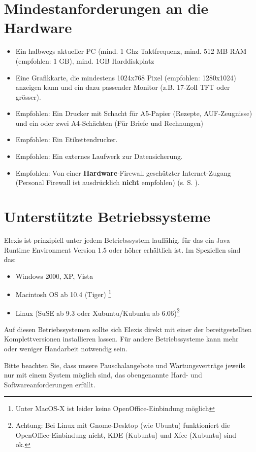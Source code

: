 %

\section{Mindestanforderungen an die Hardware}
\label{systemvoraussetzungen}
\begin{itemize}
 \item Ein halbwegs aktueller PC (mind. 1 Ghz Taktfrequenz, mind. 512 MB RAM
 (empfohlen: 1 GB), mind. 1GB Harddiskplatz
\item  Eine Grafikkarte, die mindestens 1024x768 Pixel (empfohlen: 1280x1024)
anzeigen kann und ein dazu passender Monitor (z.B. 17-Zoll TFT oder grösser).
\item Empfohlen: Ein Drucker mit Schacht für A5-Papier (Rezepte, AUF-Zeugnisse) und ein oder zwei A4-Schächten (Für Briefe und Rechnungen)
\item Empfohlen: Ein Etikettendrucker.
\item Empfohlen: Ein externes Laufwerk zur Datensicherung.
\item Empfohlen: Von einer \textbf{Hardware}-Firewall geschützter Internet-Zugang (Personal Firewall ist ausdrücklich \textbf{nicht} empfohlen) (s. S. \pageref{sicherheit}).
\end{itemize}

\section{Unterstützte Betriebssysteme}
Elexis ist prinzipiell unter jedem Betriebssystem lauffähig, für das ein Java Runtime Environment Version 1.5
oder höher erhältlich ist. Im Speziellen sind das:
\begin{itemize}
\item  Windows 2000, XP, Vista
\item  Macintosh OS ab 10.4 (Tiger)  \footnote{Unter MacOS-X ist leider keine
OpenOffice-Einbindung möglich}
\item Linux (SuSE ab 9.3 oder Xubuntu/Kubuntu ab 6.06)\footnote{Achtung: Bei Linux mit Gnome-Desktop (wie Ubuntu) funktioniert die OpenOffice-Einbindung nicht, KDE (Kubuntu) und Xfce (Xubuntu) sind ok.}
\end{itemize}
Auf diesen Betriebssystemen sollte sich Elexis direkt mit einer der bereitgestellten Komplettversionen installieren lassen. Für andere Betriebssysteme kann mehr oder weniger Handarbeit notwendig sein.

Bitte beachten Sie, dass unsere Pauschalangebote und Wartungsverträge jeweils nur mit einem System möglich sind, das obengenannte Hard- und  Softwareanforderungen erfüllt. 